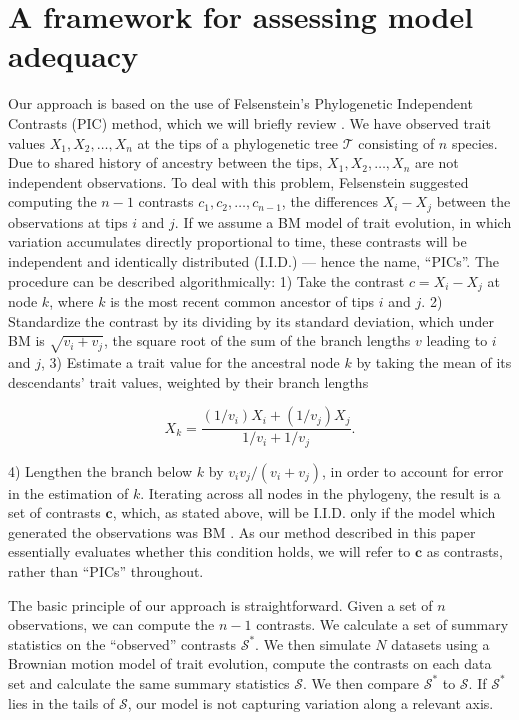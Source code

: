 \documentclass[a4paper,12pt]{article}
\begin{document}
\section*{A framework for assessing model adequacy}

Our approach is based on the use of Felsenstein's \citep{Felsenstein1973, Felsenstein1985} Phylogenetic Independent Contrasts (PIC) method, which we will briefly review \citep[for more details, see][]{Felsenstein1985, Rohlf2001, Blomberg2012}. We have observed trait values $X_1, X_2, \ldots, X_n$ at the tips of a phylogenetic tree $\mathcal{T}$ consisting of $n$ species. Due to shared history of ancestry between the tips, $X_1, X_2, \ldots, X_n$ are not independent observations. To deal with this problem, Felsenstein suggested computing the $n-1$ contrasts $c_1, c_2, \ldots, c_{n-1}$, the differences $X_{i} - X_{j}$ between the observations at tips $i$ and $j$. If we assume a BM model of trait evolution, in which variation accumulates directly proportional to time, these contrasts will be independent and identically distributed (I.I.D.) --- hence the name, ``PICs''. The procedure can be described algorithmically: 1) Take the contrast $c = X_i - X_j$ at node $k$, where $k$ is the most recent common ancestor of tips $i$ and $j$. 2) Standardize the contrast by its dividing by its standard deviation, which under BM is $\sqrt{v_i + v_j}$, the square root of the sum of the branch lengths $v$ leading to $i$ and $j$, 3) Estimate a trait value for the ancestral node $k$ by taking the mean of its descendants' trait values, weighted by their branch lengths

\begin{equation}
X_k = \frac{(1 / v_i)X_i + (1 / v_j)X_j}{1/v_i + 1/v_j}.
\end{equation}

4) Lengthen the branch below $k$ by $v_i v_j / (v_i + v_j)$, in order to account for error in the estimation of $k$. Iterating across all nodes in the phylogeny, the result is a set of contrasts $\mathbf{c}$, which, as stated above, will be I.I.D. only if the model which generated the observations was BM \citep{Felsenstein1985, Rohlf2001}. As our method described in this paper essentially evaluates whether this condition holds, we will refer to $\mathbf{c}$ as contrasts, rather than ``PICs'' throughout.

The basic principle of our approach is straightforward. Given a set of $n$ observations, we can compute the $n-1$ contrasts. We calculate a set of summary statistics on the ``observed'' contrasts $\mathcal{S}^*$. We then simulate $N$ datasets using a Brownian motion model of trait evolution, compute the contrasts on each data set and calculate the same summary statistics $\mathcal{S}$. We then compare $\mathcal{S}^*$ to $\mathcal{S}$. If $\mathcal{S}^*$ lies in the tails of $\mathcal{S}$, our model is not capturing variation along a relevant axis.
\end{document}
